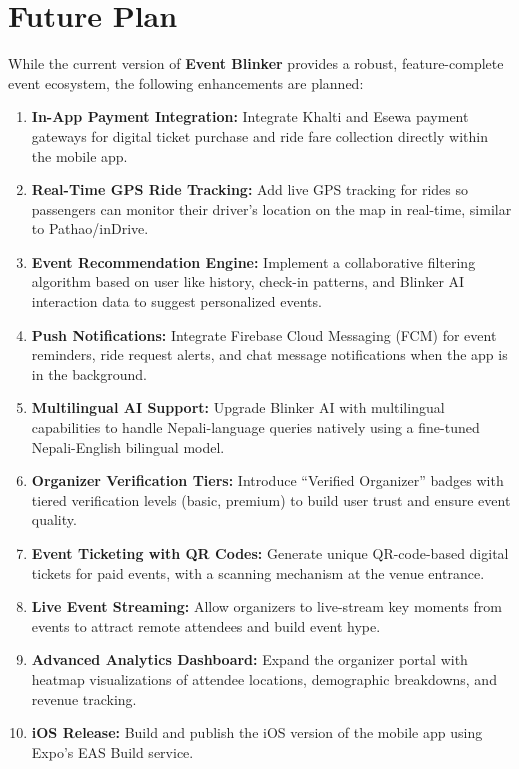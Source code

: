 \chapter{Future Plan}

While the current version of \textbf{Event Blinker} provides a robust, feature-complete event ecosystem, the following enhancements are planned:

\begin{enumerate}
    \item \textbf{In-App Payment Integration:} Integrate Khalti and Esewa payment gateways for digital ticket purchase and ride fare collection directly within the mobile app.
    
    \item \textbf{Real-Time GPS Ride Tracking:} Add live GPS tracking for rides so passengers can monitor their driver's location on the map in real-time, similar to Pathao/inDrive.
    
    \item \textbf{Event Recommendation Engine:} Implement a collaborative filtering algorithm based on user like history, check-in patterns, and Blinker AI interaction data to suggest personalized events.
    
    \item \textbf{Push Notifications:} Integrate Firebase Cloud Messaging (FCM) for event reminders, ride request alerts, and chat message notifications when the app is in the background.
    
    \item \textbf{Multilingual AI Support:} Upgrade Blinker AI with multilingual capabilities to handle Nepali-language queries natively using a fine-tuned Nepali-English bilingual model.
    
    \item \textbf{Organizer Verification Tiers:} Introduce ``Verified Organizer'' badges with tiered verification levels (basic, premium) to build user trust and ensure event quality.
    
    \item \textbf{Event Ticketing with QR Codes:} Generate unique QR-code-based digital tickets for paid events, with a scanning mechanism at the venue entrance.
    
    \item \textbf{Live Event Streaming:} Allow organizers to live-stream key moments from events to attract remote attendees and build event hype.
    
    \item \textbf{Advanced Analytics Dashboard:} Expand the organizer portal with heatmap visualizations of attendee locations, demographic breakdowns, and revenue tracking.
    
    \item \textbf{iOS Release:} Build and publish the iOS version of the mobile app using Expo's EAS Build service.
\end{enumerate}

